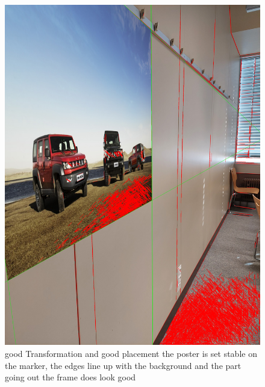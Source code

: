 \documentclass[a4paper,twocolumn]{article}
\begin{document}
\begin{figure}[h!]
\centering
\includegraphics[width=0.9\columnwidth]{img/20221115_113440.jpg} %
\caption{good Transformation and good placement the poster is set stable on the marker, the edges line up with the background and the part going out the frame does look good}
\label{fig:20221115_113440.jpg}
\end{figure}
\end{document}
